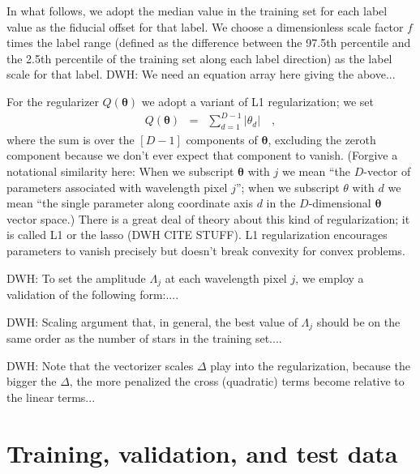 \documentclass[12pt,preprint]{aastex}
\newcommand{\Dvector}[1]{\boldsymbol{#1}}
\newcommand{\vectheta}{\Dvector{\theta}}
\begin{document}
In what follows, we adopt the median value in the training set for
each label value as the fiducial offset for that label.
We choose a dimensionless scale factor $f$ times the label range (defined
as the difference between the 97.5th percentile and the 2.5th
percentile of the training set along each label direction) as the
label scale for that label.
DWH: We need an equation array here giving the above...

For the regularizer $Q(\vectheta)$ we adopt a variant of L1
regularization; we set
\begin{eqnarray}
  Q(\vectheta) &=& \sum_{d=1}^{D-1} |\theta_d|
  \quad,
\end{eqnarray}
where the sum is over the $[D-1]$ components of $\vectheta$, excluding
the zeroth component because we don't ever expect that component to
vanish.
(Forgive a notational similarity here: When we subscript $\vectheta$ with
$j$ we mean ``the $D$-vector of parameters associated with wavelength
pixel $j$''; when we subscript $\theta$ with $d$ we mean ``the single
parameter along coordinate axis $d$ in the $D$-dimensional $\vectheta$
vector space.)
There is a great deal of theory about this kind of regularization; it
is called L1 or the lasso (DWH CITE STUFF).
L1 regularization encourages parameters to vanish precisely but
doesn't break convexity for convex problems.

DWH: To set the amplitude $\Lambda_j$ at each wavelength pixel $j$, we
employ a validation of the following form:....

DWH: Scaling argument that, in general, the best value of $\Lambda_j$
should be on the same order as the number of stars in the training
set....

DWH: Note that the vectorizer scales $\Delta$ play into the
regularization, because the bigger the $\Delta$, the more penalized
the cross (quadratic) terms become relative to the linear terms...

\section{Training, validation, and test data}
\end{document}
